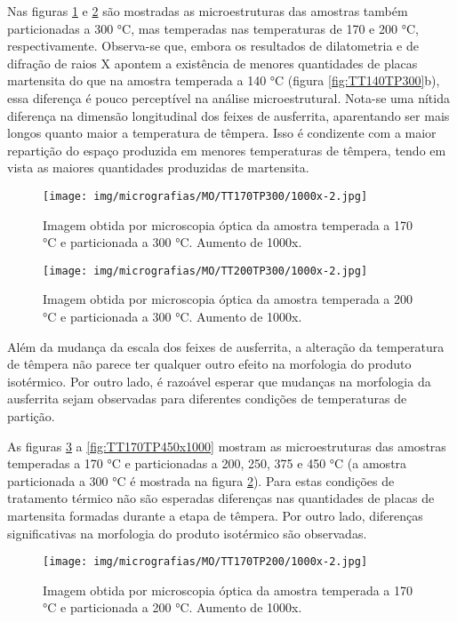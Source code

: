 Nas figuras \ref{fig:TT170TP300x1000} e \ref{fig:TT200TP300x1000} são mostradas as microestruturas das amostras também particionadas a 300 °C, mas temperadas nas temperaturas de 170 e 200 °C, respectivamente. Observa-se que, embora os resultados de dilatometria e de difração de raios X apontem a existência de menores quantidades de placas martensita do que na amostra temperada a 140 °C (figura \ref{fig:TT140TP300}b), essa diferença é pouco perceptível na análise microestrutural. Nota-se uma nítida diferença na dimensão longitudinal dos feixes de ausferrita, aparentando ser mais longos quanto maior a temperatura de têmpera. Isso é condizente com a maior repartição do espaço produzida em menores temperaturas de têmpera, tendo em vista as maiores quantidades produzidas de martensita.

\begin{figure}
	\texttt{[image: img/micrografias/MO/TT170TP300/1000x-2.jpg]}
	\caption{Imagem obtida por microscopia óptica da amostra temperada a 170 °C e particionada a 300 °C. Aumento de 1000x.}
	\label{fig:TT170TP300x1000}
\end{figure}

\begin{figure}
	\texttt{[image: img/micrografias/MO/TT200TP300/1000x-2.jpg]}
	\caption{Imagem obtida por microscopia óptica da amostra temperada a 200 °C e particionada a 300 °C. Aumento de 1000x.}
	\label{fig:TT200TP300x1000}
\end{figure}

Além da mudança da escala dos feixes de ausferrita, a alteração da temperatura de têmpera não parece ter qualquer outro efeito na morfologia do produto isotérmico. Por outro lado, é razoável esperar que mudanças na morfologia da ausferrita sejam observadas para diferentes condições de temperaturas de partição.

As figuras \ref{fig:TT170TP200x1000} a \ref{fig:TT170TP450x1000} mostram as microestruturas das amostras temperadas a 170 °C e particionadas a 200, 250, 375 e 450 °C (a amostra particionada a 300 °C é mostrada na figura \ref{fig:TT200TP300x1000}). Para estas condições de tratamento térmico não são esperadas diferenças nas quantidades de placas de martensita formadas durante a etapa de têmpera. Por outro lado, diferenças significativas na morfologia do produto isotérmico são observadas.

\begin{figure}
	\texttt{[image: img/micrografias/MO/TT170TP200/1000x-2.jpg]}
	\caption{Imagem obtida por microscopia óptica da amostra temperada a 170 °C e particionada a 200 °C. Aumento de 1000x.}
	\label{fig:TT170TP200x1000}
\end{figure}

